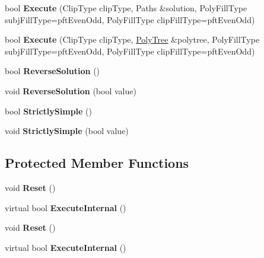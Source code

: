 \begin{DoxyCompactItemize}
bool {\bfseries Execute} (Clip\+Type clip\+Type, Paths \&solution, Poly\+Fill\+Type subj\+Fill\+Type=pft\+Even\+Odd, Poly\+Fill\+Type clip\+Fill\+Type=pft\+Even\+Odd)
\item 
\mbox{\label{classClipperLib_1_1Clipper_aceb19a1e5a5c9e31067f4d1177793403}} 
bool {\bfseries Execute} (Clip\+Type clip\+Type, \hyperlink{classClipperLib_1_1PolyTree}{Poly\+Tree} \&polytree, Poly\+Fill\+Type subj\+Fill\+Type=pft\+Even\+Odd, Poly\+Fill\+Type clip\+Fill\+Type=pft\+Even\+Odd)
\item 
\mbox{\label{classClipperLib_1_1Clipper_ad556ba9961f498de02d55dc95bc5a889}} 
bool {\bfseries Reverse\+Solution} ()
\item 
\mbox{\label{classClipperLib_1_1Clipper_a44afc0c82a1d2607829b5fd21f7644ef}} 
void {\bfseries Reverse\+Solution} (bool value)
\item 
\mbox{\label{classClipperLib_1_1Clipper_a50eb4c514466ed37fd365769e0bcf67b}} 
bool {\bfseries Strictly\+Simple} ()
\item 
\mbox{\label{classClipperLib_1_1Clipper_a85aa82d75e0d7d1f380d2e96231d6aa3}} 
void {\bfseries Strictly\+Simple} (bool value)
\end{DoxyCompactItemize}
\subsection*{Protected Member Functions}
\begin{DoxyCompactItemize}
\item 
\mbox{\label{classClipperLib_1_1Clipper_a14c704b062e8a079e34a8ce40838861e}} 
void {\bfseries Reset} ()
\item 
\mbox{\label{classClipperLib_1_1Clipper_a3e8757e5f8a6ffcb7fd0f9630fde02d3}} 
virtual bool {\bfseries Execute\+Internal} ()
\item 
\mbox{\label{classClipperLib_1_1Clipper_a14c704b062e8a079e34a8ce40838861e}} 
void {\bfseries Reset} ()
\item 
\mbox{\label{classClipperLib_1_1Clipper_a24139926e90040119e767450ba901690}} 
virtual bool {\bfseries Execute\+Internal} ()
\end{DoxyCompactItemize}
